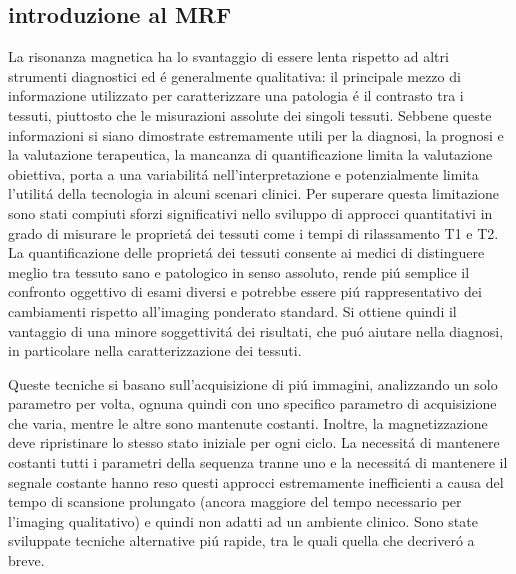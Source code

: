 \documentclass[a4paper,10pt]{article}
\begin{document}
 \subsection{introduzione al MRF}
 
 La risonanza magnetica ha lo svantaggio di essere lenta rispetto ad altri strumenti diagnostici ed \'e generalmente qualitativa: il principale mezzo di informazione utilizzato per caratterizzare una patologia \'e il contrasto tra i tessuti, piuttosto che le misurazioni assolute dei singoli tessuti. Sebbene queste informazioni si siano dimostrate estremamente utili per la diagnosi, la prognosi e la valutazione terapeutica, la mancanza di quantificazione limita la valutazione obiettiva, porta a una variabilit\'a nell'interpretazione e potenzialmente limita l'utilit\'a della tecnologia in alcuni scenari clinici. Per superare questa limitazione sono stati compiuti sforzi significativi nello sviluppo di approcci quantitativi in grado di misurare le propriet\'a dei tessuti come i tempi di rilassamento T1 e T2. La quantificazione delle propriet\'a dei tessuti consente ai medici di distinguere meglio tra tessuto sano e patologico in senso assoluto, rende pi\'u semplice il confronto oggettivo di esami diversi e potrebbe essere pi\'u rappresentativo dei cambiamenti rispetto all'imaging ponderato standard. Si ottiene quindi il vantaggio di una minore soggettivit\'a dei risultati, che pu\'o aiutare nella diagnosi, in particolare nella caratterizzazione dei tessuti.  
 
 Queste tecniche si basano sull'acquisizione di pi\'u immagini, analizzando un solo parametro per volta, ognuna quindi con uno specifico parametro di acquisizione che varia, mentre le altre sono mantenute costanti. Inoltre, la magnetizzazione deve ripristinare lo stesso stato iniziale per ogni ciclo. La necessit\'a di mantenere costanti tutti i parametri della sequenza tranne uno e la necessit\'a di mantenere il segnale costante hanno reso questi approcci estremamente inefficienti a causa del tempo di scansione prolungato (ancora maggiore del tempo necessario per l'imaging qualitativo) e quindi non adatti ad un ambiente clinico. Sono state sviluppate tecniche alternative pi\'u rapide, tra le quali quella che decriver\'o a breve. 
 
\end{document}
